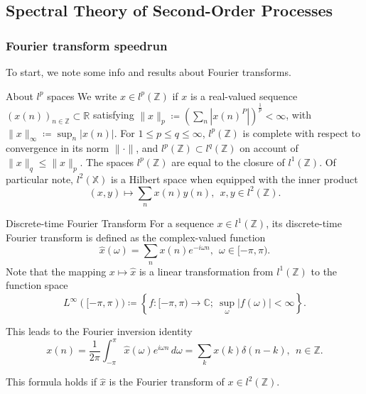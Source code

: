 \documentclass{article}
\begin{document}
\subsection{Spectral Theory of Second-Order Processes}


\subsubsection{Fourier transform speedrun}
To start, we note some info and results about Fourier transforms. 

\begin{misc}{About \( l^p \) spaces }{}
We write \( x\in l^p(\mathbb{Z} ) \) if \( x \) is a real-valued sequence \( (x(n))_{n \in \mathbb{Z} } \subset \mathbb{R}  \) satisfying \( \lVert x \rVert _p \coloneqq \left( \sum_{n} \left\lvert x(n)^P \right\rvert  \right)^\frac{1}{p} < \infty  \), with \( \lVert x \rVert _ \infty \coloneqq \sup _n\left\lvert x(n) \right\rvert  \). For \( 1\leq p\leq q \leq \infty  \), \( l^p(\mathbb{Z} ) \) is complete with respect to convergence in its norm \( \lVert \cdot  \rVert  \), and \( l^p(\mathbb{Z} )\subset l^q(\mathbb{Z} ) \) on account of \( \lVert x \rVert _q \leq  \lVert x \rVert _p \). The spaces \( l^p(\mathbb{Z} ) \)  are equal to the closure of \( l^1(\mathbb{Z} ) \). Of particular note, \( l^2(\mathbb{X} ) \) is a Hilbert space when equipped with the inner product
\[
    (x,y) \mapsto \sum_{n} x(n)y(n), \ \ x,y \in l^2(\mathbb{Z} ). 
\]
\end{misc}

\begin{defn}{Discrete-time Fourier Transform}{}
For a sequence \( x \in l^1(\mathbb{Z} ) \), its discrete-time Fourier transform is defined as the complex-valued function 
\[
    \hat{x} (\omega ) = \sum_{n} x(n)e^{-i \omega n}, \ \ \omega \in [- \pi ,\pi ).
\]
Note that the mapping \( x \mapsto \hat{x} \) is a linear transformation from \( l^1(\mathbb{Z} )\) to  the function space 
\[
    L^{\infty} ([-\pi, \pi ))\coloneqq \left\{ f:[- \pi ,\pi )\to \mathbb{C};  \ \sup _\omega |f(\omega )|< \infty   \right\}. 
\]

This leads to the Fourier inversion identity 
\[
    x(n) = \frac{1}{2\pi } \int_{- \pi }^{\pi } \hat{x} (\omega )e^{i \omega n}  \,d \omega  = \sum_{k} x(k)\delta (n - k) , \ \ n \in  \mathbb{Z}. 
\]

This formula holds if \( \hat{x}  \) is the Fourier transform of \( x\in l^2(\mathbb{Z} ) \). 



\end{defn}
\end{document}
